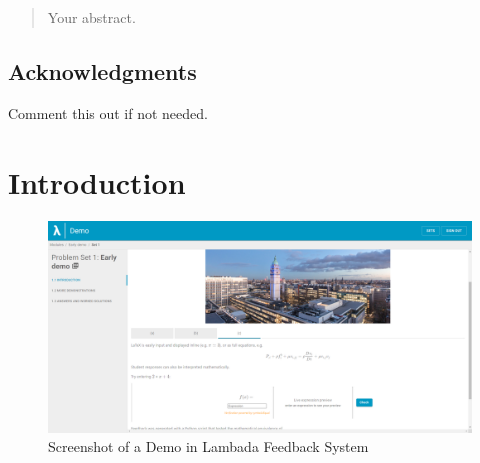 \documentclass[12pt,twoside]{report}
\date{\today}
\begin{document}



\clearpage{\pagestyle{empty}\cleardoublepage}
\setcounter{page}{1}
\pagestyle{fancy}

\begin{abstract}
Your abstract.
\end{abstract}

\cleardoublepage
\section*{Acknowledgments}
Comment this out if not needed.

\clearpage{\pagestyle{empty}\cleardoublepage}

\tableofcontents 


\clearpage{\pagestyle{empty}\cleardoublepage}
\setcounter{page}{1}
\fancyhead[LE,RO]{\slshape \rightmark}
\fancyhead[LO,RE]{\slshape \leftmark}

\chapter{Introduction}
\label{Introduction}


\begin{figure}
    \centering
    \includegraphics[width=\hsize]{figures/lambdafeedback-screenshot.png}
    \caption{Screenshot of a Demo in Lambada Feedback System}
    \label{fig:demoscreenshot}
\end{figure}
\end{document}
